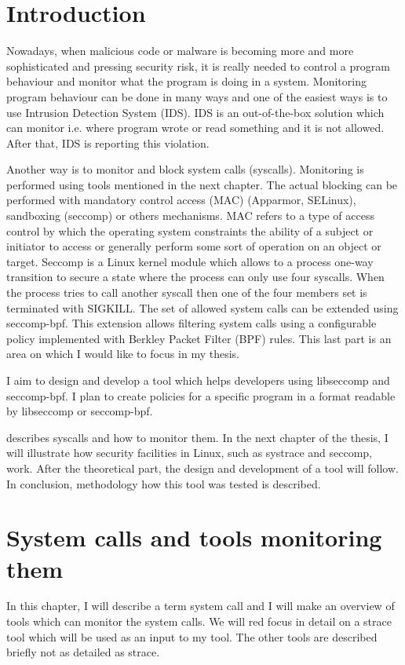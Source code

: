 
\listoftodos

\chapter{Introduction}
Nowadays, when malicious code or malware is becoming more and more sophisticated and pressing security risk, it is really needed to control a program behaviour and monitor what the program is doing in a system.
Monitoring program behaviour can be done in many ways and one of the easiest ways is to use Intrusion Detection System (IDS).
IDS is an out-of-the-box solution which can monitor i.e. where program wrote or read something and it is not allowed.
After that, IDS is reporting this violation. %

Another way is to monitor and block system calls (syscalls).
Monitoring is performed using tools mentioned in the next chapter.
The actual blocking can be performed with mandatory control access (MAC) (Apparmor, SELinux), sandboxing (seccomp) or others mechanisms.
MAC refers to a type of access control by which the operating system constraints the ability of a subject or initiator to access or generally perform some sort of operation on an object or target.
Seccomp is a Linux kernel module which allows to a process one-way transition to secure a state where the process can only use four syscalls.
When the process tries to call another syscall then one of the four members set is terminated with SIGKILL.
The set of allowed system calls can be extended using seccomp-bpf.
This extension allows filtering system calls using a configurable policy implemented with Berkley Packet Filter (BPF) rules.
This last part is an area on which I would like to focus in my thesis.

I aim to design and develop a tool which helps developers using libseccomp and seccomp-bpf.
I plan to create policies for a specific program in a format readable by libseccomp or seccomp-bpf.

 describes syscalls and how to monitor them.
In the next chapter of the thesis, I will illustrate how security facilities in Linux, such as systrace and seccomp, work.
After the theoretical part, the design and development of a tool will follow.
In conclusion, methodology how this tool was tested is described.

\chapter{System calls and tools monitoring them}
\label{chap:syscalls}
In this chapter, I will describe a term system call and I will make an overview of tools which can monitor the system calls.
We will red focus in detail on a strace tool which will be used as an input to my tool.
The other tools are described briefly not as detailed as strace.

